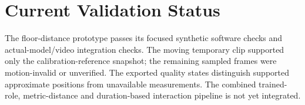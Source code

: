 \section{Current Validation Status}
The floor-distance prototype passes its focused synthetic software checks and actual-model/video integration checks. The moving temporary clip supported only the calibration-reference snapshot; the remaining sampled frames were motion-invalid or unverified. The exported quality states distinguish supported approximate positions from unavailable measurements. The combined trained-role, metric-distance and duration-based interaction pipeline is not yet integrated.
